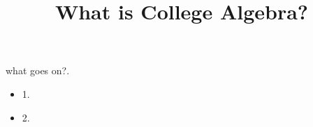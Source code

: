 \documentclass{ximera}
\title{What is College Algebra?}
\begin{document}
\begin{abstract}
\end{abstract}

\maketitle

\begin{sectionOutcomes}

what goes on?. 

\begin{itemize}
\item 1.
\item 2.
\end{itemize}

\end{sectionOutcomes}
\end{document}
